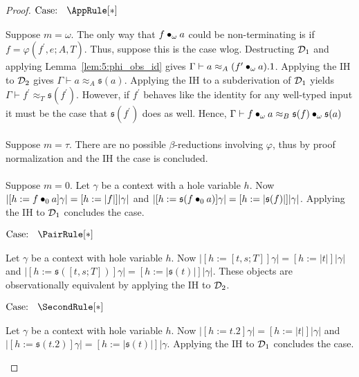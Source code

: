 \begin{proof}
    $\text{Case: }\begin{array}{c} \AppRule[*] \end{array}$
    \begin{proofcase}
        Suppose $m = \omega$.
        The only way that $f \bullet_{\omega} a$ could be non-terminating is if $f = \varphi(f^\prime, e; A, T)$.
        Thus, suppose this is the case wlog.
        Destructing $\mathcal{D}_{1}$ and applying Lemma~\ref{lem:5:phi_obs_id} gives $\Gamma \vdash a \approx_A (f^\prime \bullet_{\omega} a).1$.
        Applying the IH to $\mathcal{D}_{2}$ gives $\Gamma \vdash a \approx_A \mathfrak{s}(a)$.
        Applying the IH to a subderivation of $\mathcal{D}_{1}$ yields $\Gamma \vdash f^\prime \approx_T \mathfrak{s}(f^\prime)$.
        However, if $f^\prime$ behaves like the identity for any well-typed input it must be the case that $\mathfrak{s}(f^\prime)$ does as well.
        Hence, $\Gamma \vdash f \bullet_{\omega} a \approx_B \mathfrak{s}(f) \bullet_{\omega} \mathfrak{s}(a)$
        \\ \\
        Suppose $m = \tau$.
        There are no possible $\beta$-reductions involving $\varphi$, thus by proof normalization and the IH the case is concluded.
        \\ \\
        Suppose $m = 0$.
        Let $\gamma$ be a context with a hole variable $h$.
        Now $|[h := f \bullet_{0} a]\gamma| = [h := |f|]|\gamma|$ and $|[h := \mathfrak{s}(f \bullet_{0} a)]\gamma| = [h := |\mathfrak{s}(f)|]|\gamma|$.
        Applying the IH to $\mathcal{D}_{1}$ concludes the case.
    \end{proofcase}

    $\text{Case: }\begin{array}{c} \PairRule[*] \end{array}$
    \begin{proofcase}
        Let $\gamma$ be a context with hole variable $h$.
        Now $|[h := [t, s; T]]\gamma| = [h := |t|]|\gamma|$ and $|[h := \mathfrak{s}([t, s; T])]\gamma| = [h := |\mathfrak{s}(t)|]|\gamma|$.
        These objects are observationally equivalent by applying the IH to $\mathcal{D}_{2}$.
    \end{proofcase}

    $\text{Case: }\begin{array}{c} \SecondRule[*] \end{array}$
    \begin{proofcase}
        Let $\gamma$ be a context with hole variable $h$.
        Now $|[h := t.2]\gamma| = [h := |t|]|\gamma|$ and $|[h := \mathfrak{s}(t.2)]\gamma| = [h := |\mathfrak{s}(t)|]|\gamma$.
        Applying the IH to $\mathcal{D}_{1}$ concludes the case.
    \end{proofcase}


\end{proof}
